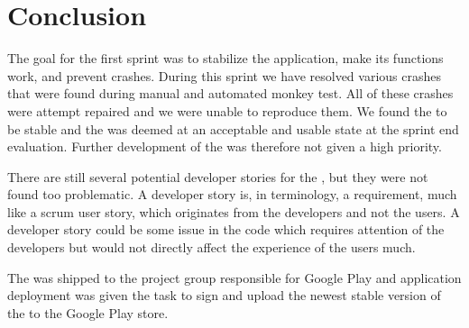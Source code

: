 
\chapter{Conclusion}
\label{cha:conclusion}

The goal for the first sprint was to stabilize the \launcher application, make its functions work, and prevent crashes. During this sprint we have resolved various crashes that were found during manual and automated monkey test. All of these crashes were attempt repaired and we were unable to reproduce them. We found the \launcher to be stable and the \launcher was deemed at an acceptable and usable state at the sprint end evaluation. Further development of the \launcher was therefore not given a high priority. 

There are still several potential developer stories for the \launcher, but they were not found too problematic. A developer story is, in \giraf terminology, a requirement, much like a scrum user story, which originates from the developers and not the users. A developer story could be some issue in the code which requires attention of the developers but would not directly affect the experience of the users much.    

The \launcher was shipped to the project group responsible for Google Play and application deployment was given the task to sign and upload the newest stable version of the \launcher to the Google Play store. 






